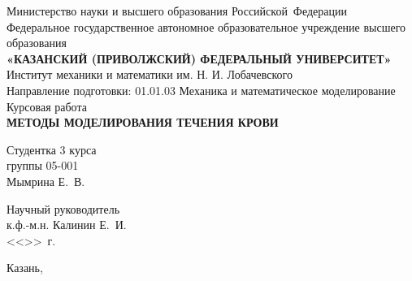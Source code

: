 \begin{titlepage}
\begin{center}

\hfill \break

\large{Министерство науки и высшего образования Российской~Федерации}\\
\footnotesize{Федеральное государственное автономное образовательное учреждение высшего образования}\\ 
\small{\textbf{«КАЗАНСКИЙ (ПРИВОЛЖСКИЙ) ФЕДЕРАЛЬНЫЙ УНИВЕРСИТЕТ»}}\\

\hfill \break
\normalsize{Институт механики и математики им. Н. И. Лобачевского}\\

\hfill \break
\normalsize{Направление подготовки: 01.01.03 Механика и математическое моделирование}\\

\vspace{25mm}
\large{Курсовая работа}\\
\large{\textbf{МЕТОДЫ МОДЕЛИРОВАНИЯ ТЕЧЕНИЯ КРОВИ}}\\
\end{center}

\vspace{20mm}
\noindent
Студентка 3 курса \\
группы 05-001 \\
Мымрина Е.~В.

\hfill \break
Научный руководитель \\
к.ф.-м.н. Калинин Е.~И. \\
<<\underline{\hspace{0,75cm}}>>\underline{\hspace{2cm}}\the\year~г.

\vspace{\fill}

\begin{center}
    Казань, \the\year
\end{center}
\thispagestyle{empty}

\end{titlepage}
